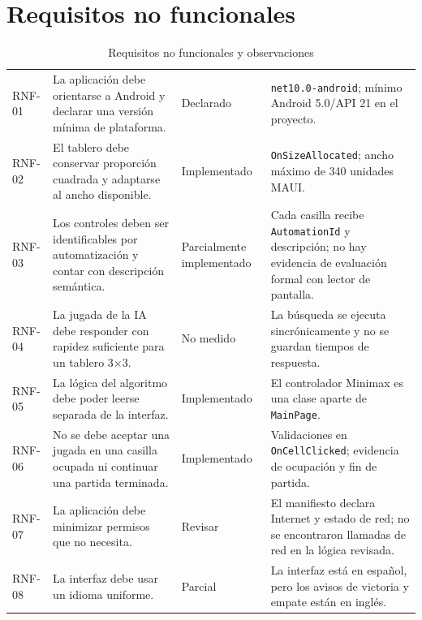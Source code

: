 \section{Requisitos no funcionales}
\begin{table}[H]
\centering
\small
\caption{Requisitos no funcionales y observaciones}\label{tab:rnf}
\begin{tabular}{P{1.0cm}P{7.5cm}P{2.7cm}P{3.0cm}}
\toprule
{} &  &  & \\
\midrule
RNF-01 & La aplicación debe orientarse a Android y declarar una versión mínima de plataforma. & Declarado & \texttt{net10.0-android}; mínimo Android 5.0/API 21 en el proyecto.\\
RNF-02 & El tablero debe conservar proporción cuadrada y adaptarse al ancho disponible. & Implementado & \texttt{OnSizeAllocated}; ancho máximo de 340 unidades MAUI.\\
RNF-03 & Los controles deben ser identificables por automatización y contar con descripción semántica. & Parcialmente implementado & Cada casilla recibe \texttt{AutomationId} y descripción; no hay evidencia de evaluación formal con lector de pantalla.\\
RNF-04 & La jugada de la IA debe responder con rapidez suficiente para un tablero 3$\times$3. & No medido & La búsqueda se ejecuta sincrónicamente y no se guardan tiempos de respuesta.\\
RNF-05 & La lógica del algoritmo debe poder leerse separada de la interfaz. & Implementado & El controlador Minimax es una clase aparte de \texttt{MainPage}.\\
RNF-06 & No se debe aceptar una jugada en una casilla ocupada ni continuar una partida terminada. & Implementado & Validaciones en \texttt{OnCellClicked}; evidencia de ocupación y fin de partida.\\
RNF-07 & La aplicación debe minimizar permisos que no necesita. & Revisar & El manifiesto declara Internet y estado de red; no se encontraron llamadas de red en la lógica revisada.\\
RNF-08 & La interfaz debe usar un idioma uniforme. & Parcial & La interfaz está en español, pero los avisos de victoria y empate están en inglés.\\
\bottomrule
\end{tabular}
\end{table}

